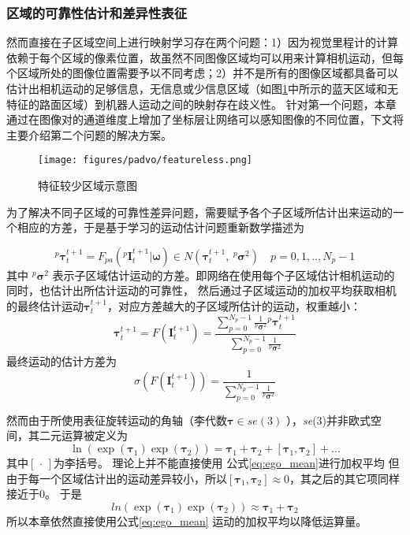 \subsubsection{区域的可靠性估计和差异性表征}
然而直接在子区域空间上进行映射学习存在两个问题：1）因为视觉里程计的计算依赖于每个区域的像素位置，故虽然不同图像区域均可以用来计算相机运动，但每个区域所处的图像位置需要予以不同考虑；2）并不是所有的图像区域都具备可以估计出相机运动的足够信息，无信息或少信息区域（如图\ref{fig:pad_featureless}中所示的蓝天区域和无特征的路面区域）到机器人运动之间的映射存在歧义性。
针对第一个问题，本章通过在图像对的通道维度上增加了坐标层让网络可以感知图像的不同位置，下文将主要介绍第二个问题的解决方案。
\begin{figure}[t]
  \centering
  \texttt{[image: figures/padvo/featureless.png]}
  \caption{特征较少区域示意图}
  \label{fig:pad_featureless}
\end{figure}

为了解决不同子区域的可靠性差异问题，需要赋予各个子区域所估计出来运动的一个相应的方差，于是基于学习的运动估计问题重新数学描述为

\begin{equation}
    ^p\mathbf{\tau}_t^{t+1}=F_{pa}(^p\mathbf{I}_t^{t+1}|\mathbf{\omega}) \in N( \mathbf{\tau}_t^{t+1},\  ^p\mathbf{\sigma}^2) \quad p=0,1,..,N_p-1
\end{equation}
其中 $^p\mathbf{\sigma}^2$ 表示子区域估计运动的方差。即网络在使用每个子区域估计相机运动的同时，也估计出所估计运动的可靠性，
然后通过子区域运动的加权平均获取相机的最终估计运动$\mathbf{\tau}_t^{t+1}$，对应方差越大的子区域所估计的运动，权重越小：
\begin{equation}
    \mathbf{\tau}_t^{t+1} = F(\mathbf{I}_t^{t+1}) = \frac{\sum_{p=0}^{N_p-1}\tfrac{1}{^p\mathbf{\sigma}^2}{^p\mathbf{\tau}_t^{t+1}}}{\sum_{p=0}^{N_p-1}\tfrac{1}{^p\mathbf{\sigma}^2}}
    \label{eq:ego_mean}
\end{equation}
最终运动的估计方差为
\begin{equation}
    \sigma \left(F(\mathbf{I}_t^{t+1})\right) =  \frac{1}{\sum_{p=0}^{N_p-1}\frac{1}{^p\mathbf{\sigma}^2}}
    \label{eq:pad_var}
\end{equation}

然而由于所使用表征旋转运动的角轴（李代数$\mathbf{\tau} \in \textit{se}(3)$ ），\textit{se}(3)并非欧式空间，其二元运算被定义为
\begin{equation}
  \label{eq:lie}
  \ln(\exp(\mathbf{\tau}_1)\exp(\mathbf{\tau}_2)) = \mathbf{\tau}_1+\mathbf{\tau}_2 +[\mathbf{\tau}_1,\mathbf{\tau}_2]+\dots
\end{equation}
其中$[\,\cdot \,]$为李括号\cite{bourbaki2003elements}。
理论上并不能直接使用
公式\eqref{eq:ego_mean}进行加权平均
但由于每一个区域估计出的运动差异较小，所以$[\mathbf{\tau}_1,\mathbf{\tau}_2]\approx 0$，其之后的其它项同样接近于0。
于是
\begin{equation}
    \label{eq:lie_approx}
    ln(\exp(\mathbf{\tau}_1)\exp(\mathbf{\tau}_2)) \approx \mathbf{\tau}_1+\mathbf{\tau}_2 
\end{equation}
所以本章依然直接使用公式\eqref{eq:ego_mean} 运动的加权平均以降低运算量。

